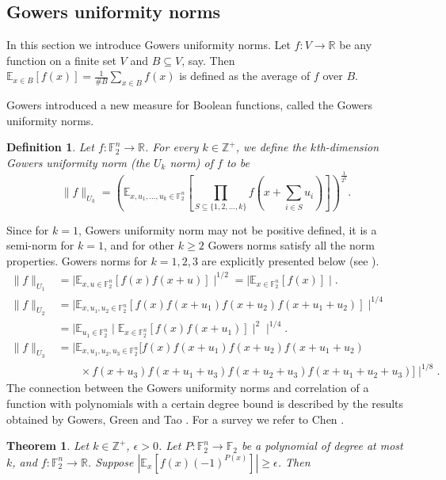 \documentclass[12 pt]{article}
\newtheorem{theorem}{Theorem}
\newtheorem{definition}{Definition}
\def\E{{\mathbb E}}
\def\F{{\mathbb F}}
\begin{document}
\subsection{Gowers uniformity norms}
In this section we introduce Gowers uniformity norms. Let $f : V \rightarrow \mathbb{R}$ be any function on a finite set $V$ and $B \subseteq V$, say.
Then $\E_{x \in B}[ f(x)] = \frac{1}{\#B} \sum_{x \in B}f(x)$ is defined as the average of $f$ over $B$. {Gowers \cite{GOW01} introduced a new measure for Boolean functions,
called the Gowers uniformity norms.
\begin{definition}\cite[Definition 2.2.1]{CHEN}
Let $f : \F_2^n \rightarrow \mathbb{R}$. For every $k \in \mathbb{Z}^+$, we define the $k$th-dimension Gowers uniformity norm (the $U_k$ norm) of $f$ to be
\begin{equation}
\| f \| _{U_k} =
\left( \E_{x, u_1, \ldots, u_k \in \F_2^n}
\left[ \prod_{S \subseteq \{1,2,\ldots,k\}} f\left( x + \sum_{i \in S}u_i \right) \right] \right)^{\frac{1}{2^k}}.
\end{equation}
\end{definition}
{Since for $k=1$, Gowers uniformity norm may not be positive defined, it is a semi-norm for $k=1$, and for other $k\geq2$ Gowers norms satisfy all the norm properties.
Gowers norms for $k = 1, 2, 3$ are explicitly presented below (see \cite{CHEN,Tao}).}
\allowdisplaybreaks[4]
\begin{align*}
\| f \| _{U_1} & = \mid \E_{x, u \in \F_2^n}[f(x)f(x+u)] \mid^{1/2}
 = \mid \E_{x \in \F_2^n} [f(x)] \mid.\\
\| f \| _{U_2} & = \mid \E_{x, u_1, u_2 \in \F_2^n}
[f(x)f(x+u_1)f(x+u_2)f(x+u_1+u_2)] \mid^{1/4} \\
& = \mid \E_{u_1 \in \F_2^n} \mid \E_{x \in \F_2^n}[f(x) f(x + u_1)]  \mid ^2 \mid^{1/4}.\\
\| f \| _{U_3} & = \mid \E_{x, u_1, u_2, u_3 \in \F_2^n}[f(x)f(x+u_1)f(x+ u_2)f(x+u_1+u_2)\\
                        &\qquad \times f(x+u_3)f(x+u_1+u_3)f(x+ u_2+u_3)f(x+u_1+u_2+u_3)]\mid^{1/8} .
\end{align*}
The connection between the Gowers uniformity norms and correlation of a function with polynomials with a certain degree bound is described by the results obtained by
Gowers, Green and Tao \cite{GOW01,GT06}. For a survey we refer to Chen \cite{CHEN}.
\begin{theorem}\cite{CHEN,GOW01,GT06}
\label{direct}
Let $k \in \mathbb{Z}^+$, $\epsilon > 0$. Let $P: \F_2^n \rightarrow \F_2$ be a polynomial of degree at most $k$, and $f : \F_2^n \rightarrow \mathbb{R}$. Suppose $\left| \mathbb{E}_{x}[f(x)(-1)^{P(x)}] \right| \ge \epsilon$. Then

\end{theorem}}
\end{document}
